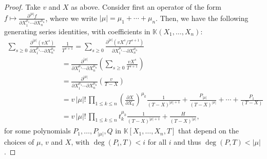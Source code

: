 \documentclass[12pt]{article}
\newcommand{\lf}{X}
\newcommand{\sqfree}{Q}
\def\K{\mathbb{K}}
\def\K {\ensuremath{\mathbb{K}}}
\begin{document}
\begin{proof}
  Take $v$ and $\lf$ as above. Consider first an operator of the form $f
  \mapsto \frac{ \partial^{|\mu|} f} {\partial X_1^{\mu_1} \cdots
    \partial X_n^{\mu_n}}$, where we write
  $|\mu|=\mu_1+\cdots+\mu_n$. Then, we have the following generating
  series identities, with coefficients in $\K(X_1,\dots,X_n)$:
  \begin{align*}
    \sum_{s \ge 0} 
    \frac{ \partial^{|\mu|} ( v \lf^s )} {\partial X_1^{\mu_1} \cdots
      \partial X_n^{\mu_n}}
    &\frac{1}{T^{s+1}} 
    =  \sum_{s \ge 0} 
    \frac{ \partial^{|\mu|} (v \lf^s/T^{s+1})} {\partial X_1^{\mu_1} \cdots
      \partial X_n^{\mu_n}}\\
    &=  
    \frac{ \partial^{|\mu|} } {\partial X_1^{\mu_1} \cdots
      \partial X_n^{\mu_n}}
    \left (\sum_{s \ge 0} \frac{v \lf^s}{T^{s+1}}\right ) \\
    &= \frac{ \partial^{|\mu|} } {\partial X_1^{\mu_1} \cdots
      \partial X_n^{\mu_n}}
    \left (\frac v{T-\lf} \right ) \\
    &= v\, |\mu|!\, \prod_{1 \le k \le n} 
    \left (\frac{ \partial \lf} {\partial X_k} \right)^{\mu_k}
    \frac {1}{(T-\lf)^{|\mu|+1}} + \frac{P_{|\mu|}}{(T-\lf)^{|\mu|}} + \cdots + \frac{P_{1}}{(T-\lf)}\\
    &= v\, |\mu|!\, \prod_{1 \le k \le n} 
    t_k^{\mu_k}
    \frac {1}{(T-\lf)^{|\mu|+1}} + \frac{H}{(T-\lf)^{|\mu|}},
  \end{align*}
  for some polynomials $P_1,\dots,P_{|\mu|},\sqfree$ in $\K[X_1,\dots,X_n,T]$ that
  depend on the choices of $\mu$, $v$ and $X$, with $\deg(P_i,T) < i$
  for all $i$ and thus $\deg(P,T) < |\mu|$.
  

\end{proof}
\end{document}

